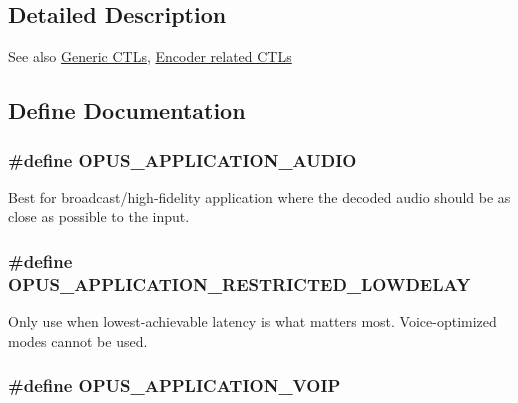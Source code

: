 \subsection{Detailed Description}
\begin{DoxySeeAlso}{See also}
\hyperlink{group__opus__genericctls}{Generic CTLs}, \hyperlink{group__opus__encoderctls}{Encoder related CTLs} 
\end{DoxySeeAlso}


\subsection{Define Documentation}
\hypertarget{group__opus__ctlvalues_ga5909f7cb35c04f1110026c6889edd345}{
\subsubsection[{OPUS\_\-APPLICATION\_\-AUDIO}]{\setlength{\rightskip}{0pt plus 5cm}\#define OPUS\_\-APPLICATION\_\-AUDIO}}
\label{group__opus__ctlvalues_ga5909f7cb35c04f1110026c6889edd345}


Best for broadcast/high-\/fidelity application where the decoded audio should be as close as possible to the input. \hypertarget{group__opus__ctlvalues_ga592232fb39db60c1369989c5c5d19a07}{
\subsubsection[{OPUS\_\-APPLICATION\_\-RESTRICTED\_\-LOWDELAY}]{\setlength{\rightskip}{0pt plus 5cm}\#define OPUS\_\-APPLICATION\_\-RESTRICTED\_\-LOWDELAY}}
\label{group__opus__ctlvalues_ga592232fb39db60c1369989c5c5d19a07}


Only use when lowest-\/achievable latency is what matters most. Voice-\/optimized modes cannot be used. \hypertarget{group__opus__ctlvalues_ga07884aa018303a419d1f7acb2f3fa669}{
\subsubsection[{OPUS\_\-APPLICATION\_\-VOIP}]{\setlength{\rightskip}{0pt plus 5cm}\#define OPUS\_\-APPLICATION\_\-VOIP}}
\label{group__opus__ctlvalues_ga07884aa018303a419d1f7acb2f3fa669}



